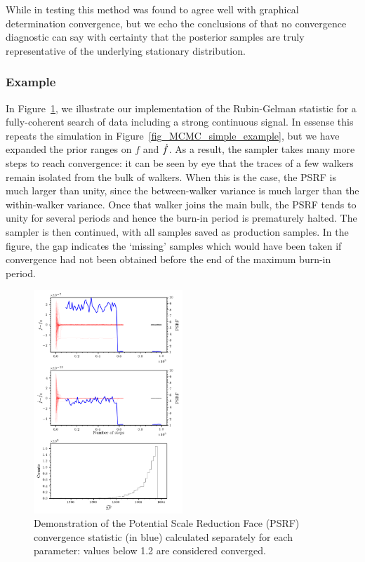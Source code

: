 \documentclass[aps, prd, twocolumn, superscriptaddress, floatfix, showpacs, nofootinbib, longbibliography]{revtex4-1}
\begin{document}
While in testing this method was found to agree well with graphical
determination convergence, but we echo the conclusions of \citet{cowles1996markov}
that no convergence diagnostic can say with certainty that the posterior
samples are truly representative of the underlying stationary distribution.

\subsubsection{Example}

In Figure~\ref{fig_MCMC_convergence_example}, we illustrate our implementation
of the Rubin-Gelman statistic for a fully-coherent search of data including
a strong continuous signal. In essense this repeats the simulation in
Figure~\ref{fig_MCMC_simple_example}, but we have expanded the prior ranges
on $f$ and $\dot{f}$. As a result, the sampler takes many more steps to reach
convergence: it can be seen by eye that the traces of a few walkers remain
isolated from the bulk of walkers. When this is the case, the PSRF is much
larger than unity, since the between-walker variance is much larger than the
within-walker variance. Once that walker joins the main bulk, the PSRF tends
to unity for several periods and hence the burn-in period is prematurely
halted. The sampler is then continued, with all samples saved as production
samples. In the figure, the gap indicates the `missing' samples which would
have been taken if convergence had not been obtained before the end of the
maximum burn-in period.
\begin{figure}[htb]
\centering
\includegraphics[width=0.5\textwidth]{fully_coherent_search_using_MCMC_convergence_walkers}
\caption{Demonstration of the Potential Scale Reduction Face (PSRF) convergence
statistic (in blue) calculated separately for each parameter: values below 1.2
are considered converged.}
\label{fig_MCMC_convergence_example}
\end{figure}
\end{document}
